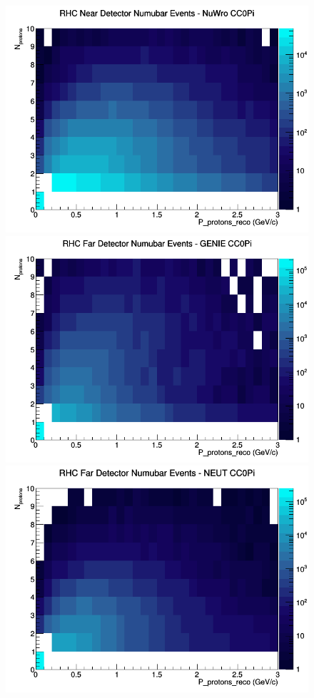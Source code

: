 \documentclass[12pt]{article}
\begin{document}
\begin{figure}[h]
\includegraphics[width=\linewidth]{eff_N_P/LAr/protons/CC0Pi_RHC_ND_numubar_N_P_NuWro.png}
\endminipage
\newline
{}
\includegraphics[width=\linewidth]{eff_N_P/LAr/protons/CC0Pi_RHC_FD_numubar_N_P_GENIE.png}
\endminipage
{}
\includegraphics[width=\linewidth]{eff_N_P/LAr/protons/CC0Pi_RHC_FD_numubar_N_P_NEUT.png}

\end{figure}
\end{document}
